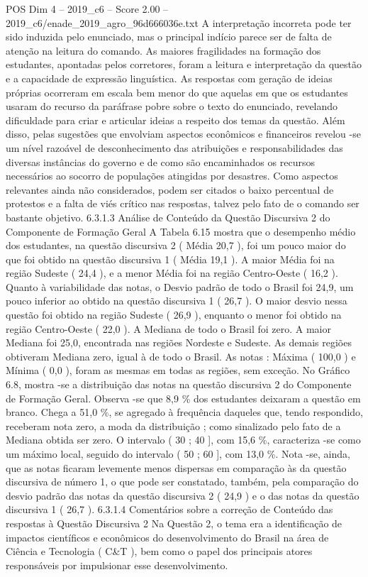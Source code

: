\begin{textsample}{POS Dim 4 – 2019\_c6 – Score 2.00 – 2019\_c6/enade\_2019\_agro\_96d666036e.txt}
A interpretação incorreta pode ter sido induzida pelo enunciado, mas o principal indício parece ser de falta de atenção na leitura do comando.
As maiores fragilidades na formação dos estudantes, apontadas pelos corretores, foram a leitura e interpretação da questão e a capacidade de expressão linguística.
As respostas com geração de ideias próprias ocorreram em escala bem menor do que aquelas em que os estudantes usaram do recurso da paráfrase pobre sobre o texto do enunciado, revelando dificuldade para criar e articular ideias a respeito dos temas da questão.
Além disso, pelas sugestões que envolviam aspectos econômicos e financeiros revelou -se um nível razoável de desconhecimento das atribuições e responsabilidades das diversas instâncias do governo e de como são encaminhados os recursos necessários ao socorro de populações atingidas por desastres.
Como aspectos relevantes ainda não considerados, podem ser citados o baixo percentual de protestos e a falta de viés crítico nas respostas, talvez pelo fato de o comando ser bastante objetivo. 6.3.1.3 Análise de Conteúdo da Questão Discursiva 2 do Componente de Formação Geral A Tabela 6.15 mostra que o desempenho médio dos estudantes, na questão discursiva 2 ( Média 20,7 ), foi um pouco maior do que foi obtido na questão discursiva 1 ( Média 19,1 ).
A maior Média foi na região Sudeste ( 24,4 ), e a menor Média foi na região Centro-Oeste ( 16,2 ).
Quanto à variabilidade das notas, o Desvio padrão de todo o Brasil foi 24,9, um pouco inferior ao obtido na questão discursiva 1 ( 26,7 ).
O maior desvio nessa questão foi obtido na região Sudeste ( 26,9 ), enquanto o menor foi obtido na região Centro-Oeste ( 22,0 ).
A Mediana de todo o Brasil foi zero.
A maior Mediana foi 25,0, encontrada nas regiões Nordeste e Sudeste.
As demais regiões obtiveram Mediana zero, igual à de todo o Brasil.
As notas : Máxima ( 100,0 ) e Mínima ( 0,0 ), foram as mesmas em todas as regiões, sem exceção.
No Gráfico 6.8, mostra -se a distribuição das notas na questão discursiva 2 do Componente de Formação Geral.
Observa -se que 8,9 \% dos estudantes deixaram a questão em branco.
Chega a 51,0 \%, se agregado à frequência daqueles que, tendo respondido, receberam nota zero, a moda da distribuição ; como sinalizado pelo fato de a Mediana obtida ser zero.
O intervalo ( 30 ; 40 ], com 15,6 \%, caracteriza -se como um máximo local, seguido do intervalo ( 50 ; 60 ], com 13,0 \%.
Nota -se, ainda, que as notas ficaram levemente menos dispersas em comparação às da questão discursiva de número 1, o que pode ser constatado, também, pela comparação do desvio padrão das notas da questão discursiva 2 ( 24,9 ) e o das notas da questão discursiva 1 ( 26,7 ). 6.3.1.4 Comentários sobre a correção de Conteúdo das respostas à Questão Discursiva 2 Na Questão 2, o tema era a identificação de impactos científicos e econômicos do desenvolvimento do Brasil na área de Ciência e Tecnologia ( C\&T ), bem como o papel dos principais atores responsáveis por impulsionar esse desenvolvimento.

\end{textsample}
